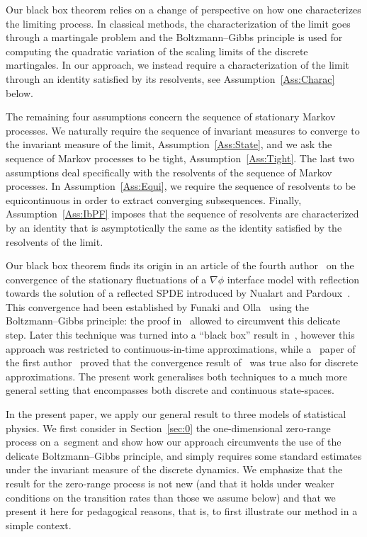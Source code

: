 \documentclass[AHL,Unicode,longabstracts]{cedram}
\theoremstyle{plain}
\newcounter{setofstep}
\newcounter{step}[setofstep]
\begin{document}
Our black box theorem relies on a change of perspective on how one characterizes the limiting process. In classical methods, the characterization of the limit goes through a martingale problem and the Boltzmann--Gibbs principle is used for computing the quadratic variation of the scaling limits of the discrete martingales. In our approach, we instead require a characterization of the limit through an identity satisfied by its resolvents, see Assumption~\ref{Ass:Charac} below.

The remaining four assumptions concern the sequence of stationary Markov processes. We naturally require the sequence of invariant measures to converge to the invariant measure of the limit, Assumption~\ref{Ass:State}, and we ask the sequence of Markov processes to be tight, Assumption~\ref{Ass:Tight}. The last two assumptions deal specifically with the resolvents of the sequence of Markov processes. In Assumption~\ref{Ass:Equi}, we require the sequence of resolvents to be equicontinuous in order to extract converging subsequences. Finally, Assumption~\ref{Ass:IbPF} imposes that the sequence of resolvents are characterized by an identity that is asymptotically the same as the identity satisfied by the resolvents of the limit.

Our black box theorem finds its origin in an article of the fourth author~\cite{Zam04} on the convergence of the stationary fluctuations of a $\nabla\phi$ interface model with reflection towards the solution of a reflected SPDE introduced by Nualart and Pardoux~\cite{NualartPardoux92}. This convergence had been established by Funaki and Olla~\cite{FunaOlla} using the Boltzmann--Gibbs principle: the proof in~\cite{Zam04} allowed to circumvent this delicate step. Later this technique was turned into a ``black box'' result in~\cite{MR2267701}, however this approach was restricted to continuous-in-time approximations, while a ~paper of the first author~\cite{EthLab} proved that the convergence result of~\cite{Zam04} was true also for discrete approximations. The present work generalises both techniques to a much more general setting that encompasses both discrete and continuous state-spaces.

In the present paper, we apply our general result to three models of statistical physics. We first consider in Section~\ref{sec:0} the one-dimensional zero-range process on a~segment and show how our approach circumvents the use of the delicate Boltzmann--Gibbs principle, and simply requires some standard estimates under the invariant measure of the discrete dynamics. We emphasize that the result for the zero-range process is not new (and that it holds under weaker conditions on the transition rates than those we assume below) and that we present it here for pedagogical reasons, that is, to first illustrate our method in a simple context.
\end{document}

